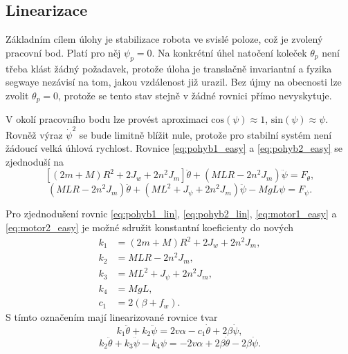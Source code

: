 \documentclass[conference]{IEEEtran}
\begin{document}
\subsection{Linearizace}
\label{sec:linearizace}

Základním cílem úlohy je stabilizace robota ve svislé poloze, což je zvolený pracovní bod.
Platí pro něj $\psi_p = 0$. Na konkrétní úhel natočení koleček $\theta_p$ není třeba klást žádný požadavek,
protože úloha je translačně invariantní a fyzika segwaye nezávisí na tom, jakou vzdálenost již urazil.
Bez újmy na obecnosti lze zvolit $\theta_p = 0$, protože se tento stav stejně v žádné rovnici přímo nevyskytuje.

V okolí pracovního bodu lze provést aproximaci $\text{cos}(\psi) \approx 1$, $\text{sin}(\psi) \approx \psi$. Rovněž výraz $\dot{\psi}^2$ se bude limitně blížit nule,
protože pro stabilní systém není žádoucí velká úhlová rychlost. Rovnice \eqref{eq:pohyb1_easy} a \eqref{eq:pohyb2_easy} se zjednoduší na
\begin{equation}
    \left[(2m + M) R^2 + 2 J_w + 2n^2 J_m\right] \ddot{\theta} + (MLR - 2n^2 J_m) \ddot{\psi} = F_\theta,
    \label{eq:pohyb1_lin}
\end{equation}
\begin{equation}
    (MLR - 2n^2 J_m) \ddot{\theta} + (ML^2 + J_\psi + 2n^2 J_m) \ddot{\psi} - MgL \psi = F_\psi.
    \label{eq:pohyb2_lin}
\end{equation}

Pro zjednodušení rovnic \eqref{eq:pohyb1_lin}, \eqref{eq:pohyb2_lin}, \eqref{eq:motor1_easy} a \eqref{eq:motor2_easy}
je možné sdružit konstantní koeficienty do nových 
\begin{equation}
    \begin{split}
        k_1 &= (2m + M) R^2 + 2 J_w + 2n^2 J_m, \\
        k_2 &= MLR - 2n^2 J_m, \\
        k_3 &= ML^2 + J_\psi + 2n^2 J_m, \\
        k_4 &= MgL, \\
        c_1 &= 2(\beta + f_w).
    \end{split}
\end{equation}
S tímto označením mají linearizované rovnice tvar
\begin{equation}
    k_1 \ddot{\theta} + k_2 \ddot{\psi} = 2v \alpha - c_1 \dot{\theta} + 2\beta\dot{\psi},
    \label{eq:pohyb1_lin_simple}
\end{equation}
\begin{equation}
    k_2 \ddot{\theta} + k_3 \ddot{\psi} - k_4 \psi = - 2v \alpha + 2\beta \dot{\theta} - 2\beta \dot{\psi}.
    \label{eq:pohyb2_lin_simple}
\end{equation}
\end{document}
